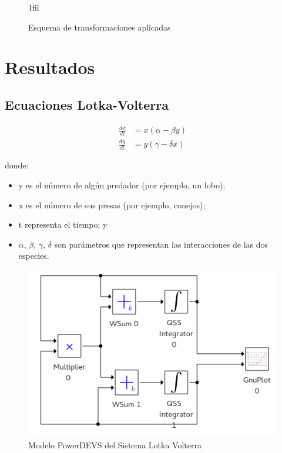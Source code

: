 \documentclass{beamer}
\makeatletter
\newcommand*{\centerfloat}{%
  \parindent \z@
  \leftskip \z@ \@plus 1fil \@minus \textwidth
  \rightskip\leftskip
  \parfillskip \z@skip}
\makeatother
\begin{document}
\begin{frame}
\begin{figure}[H]
\centerfloat
{}
\caption{Esquema de transformaciones aplicadas}
\label{fig:pipeline}
\end{figure}
\end{frame}


\chapter{Resultados}
\section{Ecuaciones Lotka-Volterra}
\begin{frame}
\begin{align*}
\frac{dx}{dt} & = x(\alpha - \beta y)\\
\frac{dy}{dt} & =y(\gamma - \delta  x)
\end{align*}

donde:
\begin{itemize}
	\item y es el número de algún predador (por ejemplo, un lobo);
    \item x es el número de sus presas (por ejemplo, conejos);
    \item t representa el tiempo; y
    \item $\alpha$, $\beta$, $\gamma$, $\delta$ son parámetros que representan las interacciones de las dos especies.
\end{itemize}
\end{frame}

\begin{frame}
\begin{figure}[H]
\includegraphics[width=0.75\linewidth]{lotka_volterra_pwd}
\caption{Modelo PowerDEVS del Sistema Lotka Volterra}
\label{model:lotka_volterra}
\end{figure}
\end{frame}
\end{document}
